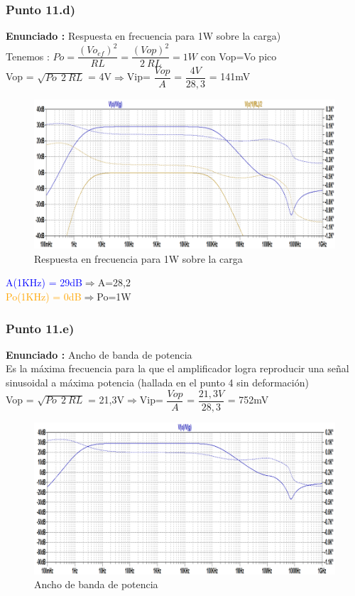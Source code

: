 \documentclass[12pt]{book}
\begin{document}
\subsubsection{Punto 11.d)}
\textbf{Enunciado : } Respuesta en frecuencia para 1W sobre la carga)\\[1cm]
Tenemos : $Po=\dfrac{(Vo_{ef})^2}{RL}=\dfrac{(Vop)^2}{2\:RL}=1W$ \quad con Vop=Vo pico\\
Vop = $\sqrt{Po\:\:2\:RL}$ = 4V\quad $\Longrightarrow$\qquad Vip= $\dfrac{Vop}{A}$ = $\dfrac{4V}{28,3}$ = 141mV
\begin{figure}[H]
\centering
\includegraphics[scale=0.4]{figuras/11-d-Pcarga1W.png}
\caption{Respuesta en frecuencia para 1W sobre la carga}
\label{figura11d}
\end{figure}
\begin{center}
\textcolor{blue}{A(1KHz) = 29dB}\qquad $\Longrightarrow$\qquad A=28,2\\
\textcolor{orange}{Po(1KHz) = 0dB}\qquad $\Longrightarrow$\qquad Po=1W
\end{center}

\subsubsection{Punto 11.e)}
\textbf{Enunciado : } Ancho de banda de potencia\\
Es la máxima frecuencia para la que el amplificador logra reproducir una señal sinusoidal a máxima potencia (hallada en el punto 4 sin deformación)\\[1cm]
Vop = $\sqrt{Po\:\:2\:RL}$ = 21,3V\qquad $\Longrightarrow$\qquad Vip= $\dfrac{Vop}{A}$ = $\dfrac{21,3V}{28,3}$ = 752mV
\begin{figure}[H]
\centering
\includegraphics[scale=0.4]{figuras/11-e-BWdePot.png}
\caption{Ancho de banda de potencia}
\label{figura11e}
\end{figure}
\end{document}
